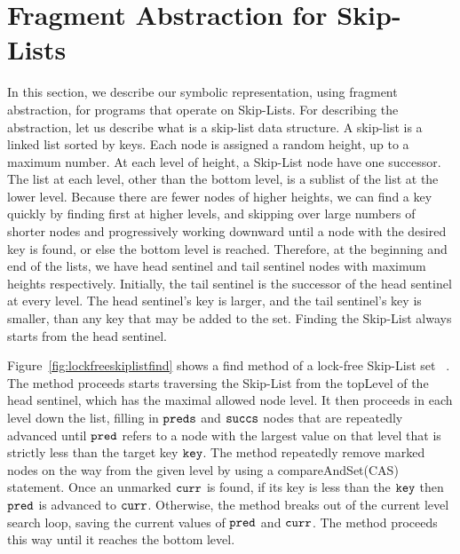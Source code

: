  \section{Fragment Abstraction for Skip-Lists}

 In this section, we describe our symbolic representation, using fragment
abstraction, for programs that operate on Skip-Lists. For describing the abstraction, let us describe what is a skip-list data structure. A skip-list is a linked list sorted by keys. Each node is assigned a random height, up to a maximum number. At each level of height, a Skip-List node have one successor. The list at each level, other than the bottom level, is a sublist of the list at the lower level. Because there are fewer nodes of higher heights, we can find a key quickly by finding first at higher levels, and skipping over large numbers of shorter nodes and progressively working downward until a node with the desired key is found, or else the bottom level is reached. Therefore, at the beginning and end of the lists, we have head sentinel and tail sentinel nodes with maximum heights respectively. Initially, the tail sentinel is the successor of the head sentinel at every level. The head sentinel's key is larger, and the tail sentinel's key is smaller, than any key that may be added to the set. Finding the Skip-List always starts from the head sentinel. 

Figure~\ref{fig:lockfreeskiplistfind} shows a find method of a lock-free Skip-List set ~\cite{ArtOfMpP}. The method proceeds starts traversing
the Skip-List from the topLevel of the head sentinel, which has the maximal
allowed node level. It then proceeds in each level down the list, filling in $\tt preds$
and $\tt succs$ nodes that are repeatedly advanced until $\tt pred$ refers to a node with
the largest value on that level that is strictly less than the target key $\tt key$. The method repeatedly remove marked nodes on the way from the
given level by using a compareAndSet(CAS) statement. Once an unmarked $\tt curr$ is found, if its key is less than the $\tt key$ then $\tt pred$ is advanced to $\tt curr$. Otherwise, the method breaks out of the current level search loop, saving the current values of $\tt pred$ and $\tt curr$. The method proceeds this way until it reaches the bottom level.
 
